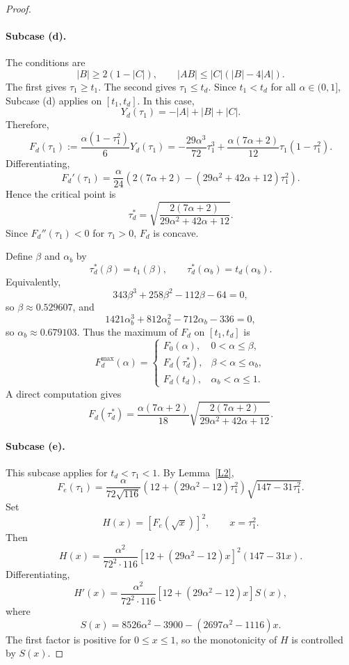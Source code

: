 \documentclass[11pt,reqno]{amsart}
\numberwithin{equation}{section}
\begin{document}
\begin{proof}
\paragraph{Subcase (d).}
The conditions are
\[
|B|\ge 2(1-|C|),\qquad |AB|\le |C|(|B|-4|A|).
\]
The first gives $\tau_1\ge t_1$. The second gives $\tau_1\le t_d$. Since $t_1<t_d$ for all $\alpha\in(0,1]$, Subcase (d) applies on $[t_1,t_d]$. In this case,
\[
Y_d(\tau_1)
=
-|A|+|B|+|C|.
\]
Therefore,
\[
F_d(\tau_1)
:=
\frac{\alpha(1-\tau_1^2)}{6}Y_d(\tau_1)
=
-\frac{29\alpha^3}{72}\tau_1^3
+
\frac{\alpha(7\alpha+2)}{12}\tau_1(1-\tau_1^2).
\]
Differentiating,
\[
F_d'(\tau_1)
=
\frac{\alpha}{24}
\left(
2(7\alpha+2)
-(29\alpha^2+42\alpha+12)\tau_1^2
\right).
\]
Hence the critical point is
\[
\tau_d^*
=
\sqrt{
\frac{2(7\alpha+2)}
{29\alpha^2+42\alpha+12}
}.
\]
Since $F_d''(\tau_1)<0$ for $\tau_1>0$, $F_d$ is concave.

Define $\beta$ and $\alpha_b$ by
\[
\tau_d^*(\beta)=t_1(\beta),\qquad
\tau_d^*(\alpha_b)=t_d(\alpha_b).
\]
Equivalently,
\[
343\beta^3+258\beta^2-112\beta-64=0,
\]
so $\beta\approx 0.529607$, and
\[
1421\alpha_b^3+812\alpha_b^2-712\alpha_b-336=0,
\]
so $\alpha_b\approx 0.679103$.
Thus the maximum of $F_d$ on $[t_1,t_d]$ is
\[
F_d^{\max}(\alpha)
=
\begin{cases}
F_0(\alpha), & 0<\alpha\le \beta,\\[6pt]
F_d(\tau_d^*), & \beta<\alpha\le \alpha_b,\\[6pt]
F_d(t_d), & \alpha_b<\alpha\le1.
\end{cases}
\]
A direct computation gives
\[
F_d(\tau_d^*)
=
\frac{\alpha(7\alpha+2)}{18}
\sqrt{
\frac{2(7\alpha+2)}
{29\alpha^2+42\alpha+12}
}.
\]

\paragraph{Subcase (e).}
This subcase applies for $t_d<\tau_1<1$. By Lemma~\ref{L2},
\[
F_e(\tau_1)
=
\frac{\alpha}{72\sqrt{116}}
\left(
12+(29\alpha^2-12)\tau_1^2
\right)
\sqrt{147-31\tau_1^2}.
\]
Set
\[
H(x)=[F_e(\sqrt{x})]^2,\qquad x=\tau_1^2.
\]
Then
\[
H(x)
=
\frac{\alpha^2}{72^2\cdot 116}
\left[
12+(29\alpha^2-12)x
\right]^2
(147-31x).
\]
Differentiating,
\[
H'(x)
=
\frac{\alpha^2}{72^2\cdot116}
\left[
12+(29\alpha^2-12)x
\right]
S(x),
\]
where
\[
S(x)
=
8526\alpha^2-3900-(2697\alpha^2-1116)x.
\]
The first factor is positive for $0\le x\le1$, so the monotonicity of $H$ is controlled by $S(x)$.


\end{proof}
\end{document}
